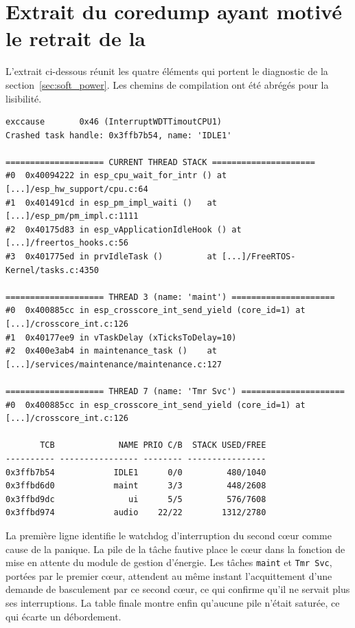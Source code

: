 \chapter{Extrait du coredump ayant motivé le retrait de la }
\label{ann:coredump}

L'extrait ci-dessous réunit les quatre éléments qui portent le diagnostic de la section~\ref{sec:soft_power}. Les chemins de compilation ont été abrégés pour la lisibilité.

\begin{lstlisting}[basicstyle=\ttfamily\scriptsize, breaklines=true]
exccause       0x46 (InterruptWDTTimoutCPU1)
Crashed task handle: 0x3ffb7b54, name: 'IDLE1'

==================== CURRENT THREAD STACK =====================
#0  0x40094222 in esp_cpu_wait_for_intr () at [...]/esp_hw_support/cpu.c:64
#1  0x401491cd in esp_pm_impl_waiti ()   at [...]/esp_pm/pm_impl.c:1111
#2  0x40175d83 in esp_vApplicationIdleHook () at [...]/freertos_hooks.c:56
#3  0x401775ed in prvIdleTask ()         at [...]/FreeRTOS-Kernel/tasks.c:4350

==================== THREAD 3 (name: 'maint') =====================
#0  0x400885cc in esp_crosscore_int_send_yield (core_id=1) at [...]/crosscore_int.c:126
#1  0x40177ee9 in vTaskDelay (xTicksToDelay=10)
#2  0x400e3ab4 in maintenance_task ()    at [...]/services/maintenance/maintenance.c:127

==================== THREAD 7 (name: 'Tmr Svc') =====================
#0  0x400885cc in esp_crosscore_int_send_yield (core_id=1) at [...]/crosscore_int.c:126

       TCB             NAME PRIO C/B  STACK USED/FREE
---------- ---------------- -------- ----------------
0x3ffb7b54            IDLE1      0/0         480/1040
0x3ffbd6d0            maint      3/3         448/2608
0x3ffbd9dc               ui      5/5         576/7608
0x3ffbd974            audio    22/22        1312/2780
\end{lstlisting}

La première ligne identifie le watchdog d'interruption du second cœur comme cause de la panique. La pile de la tâche fautive place le cœur dans la fonction de mise en attente du module de gestion d'énergie. Les tâches \texttt{maint} et \texttt{Tmr Svc}, portées par le premier cœur, attendent au même instant l'acquittement d'une demande de basculement par ce second cœur, ce qui confirme qu'il ne servait plus ses interruptions. La table finale montre enfin qu'aucune pile n'était saturée, ce qui écarte un débordement.